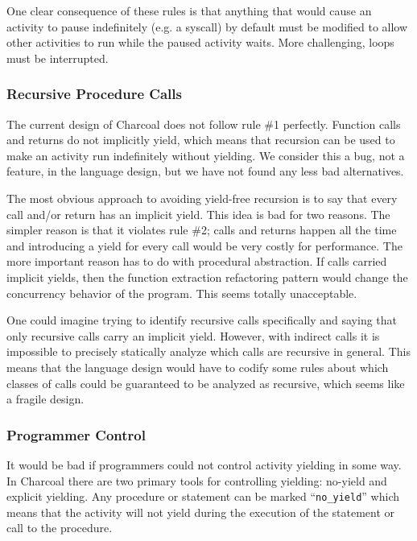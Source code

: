 \documentclass[10pt,preprint]{sigplanconf}
\begin{document}
One clear consequence of these rules is that anything that would cause an activity to pause indefinitely (e.g. a syscall) by default must be modified to allow other activities to run while the paused activity waits.
More challenging, loops must be interrupted.

\subsubsection{Recursive Procedure Calls}

The current design of Charcoal does not follow rule \#1 perfectly.
Function calls and returns do not implicitly yield, which means that recursion can be used to make an activity run indefinitely without yielding.
We consider this a bug, not a feature, in the language design, but we have not found any less bad alternatives.

The most obvious approach to avoiding yield-free recursion is to say that every call and/or return has an implicit yield.
This idea is bad for two reasons.
The simpler reason is that it violates rule \#2; calls and returns happen all the time and introducing a yield for every call would be very costly for performance.
The more important reason has to do with procedural abstraction.
If calls carried implicit yields, then the function extraction refactoring pattern would change the concurrency behavior of the program.
This seems totally unacceptable.

One could imagine trying to identify recursive calls specifically and saying that only recursive calls carry an implicit yield.
However, with indirect calls it is impossible to precisely statically analyze which calls are recursive in general.
This means that the language design would have to codify some rules about which classes of calls could be guaranteed to be analyzed as recursive, which seems like a fragile design.

\subsubsection{Programmer Control}

It would be bad if programmers could not control activity yielding in some way.
In Charcoal there are two primary tools for controlling yielding: no-yield and explicit yielding.
Any procedure or statement can be marked ``\texttt{no\_yield}'' which means that the activity will not yield during the execution of the statement or call to the procedure.
\end{document}
